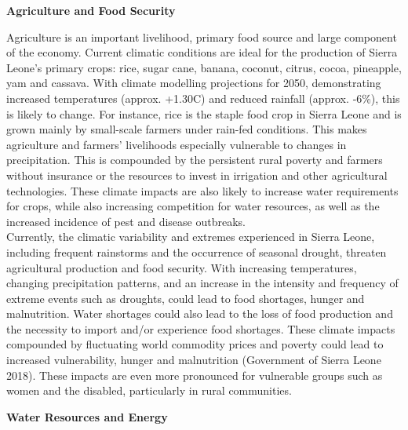 \documentclass[
]{book}
\begin{document}
\textbf{Agriculture and Food Security}

Agriculture is an important livelihood, primary food source and large component of the economy. Current climatic conditions are ideal for the production of Sierra Leone's primary crops: rice, sugar cane, banana, coconut, citrus, cocoa, pineapple, yam and cassava. With climate modelling projections for 2050, demonstrating increased temperatures (approx. +1.30C) and reduced rainfall (approx. ‐6\%), this is likely to change. For instance, rice is the staple food crop in Sierra Leone and is grown mainly by small-scale farmers under rain-fed conditions. This makes agriculture and farmers' livelihoods especially vulnerable to changes in precipitation. This is compounded by the persistent rural poverty and farmers without insurance or the resources to invest in irrigation and other agricultural technologies. These climate impacts are also likely to increase water requirements for crops, while also increasing competition for water resources, as well as the increased incidence of pest and disease outbreaks.\\
Currently, the climatic variability and extremes experienced in Sierra Leone, including frequent rainstorms and the occurrence of seasonal drought, threaten agricultural production and food security. With increasing temperatures, changing precipitation patterns, and an increase in the intensity and frequency of extreme events such as droughts, could lead to food shortages, hunger and malnutrition. Water shortages could also lead to the loss of food production and the necessity to import and/or experience food shortages. These climate impacts compounded by fluctuating world commodity prices and poverty could lead to increased vulnerability, hunger and malnutrition (Government of Sierra Leone 2018). These impacts are even more pronounced for vulnerable groups such as women and the disabled, particularly in rural communities.

\textbf{Water Resources and Energy}
\end{document}
